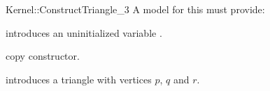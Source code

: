 \begin{ccRefFunctionObjectConcept}{Kernel::ConstructTriangle_3}
A model for this must provide:



\ccHidden {}
             {introduces an uninitialized variable .}

\ccHidden {}
 	    {copy constructor.}

            {introduces a triangle  with vertices $p$, $q$ and $r$.}

\ccSeeAlso
{}\\

\end{ccRefFunctionObjectConcept}
